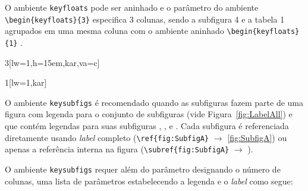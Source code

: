 	O ambiente \verb|keyfloats| pode ser aninhado e o parâmetro  do ambiente \verb|\begin{keyfloats}{3}| especifica 3 colunas, sendo a subfigura 4 e a tabela 1 agrupados em uma mesma coluna com o ambiente aninhado  \verb|\begin{keyfloats}{1}| .
			
			\begin{keyfloats}{3}[lw=1,h=15em,kar,va=c]
				\begin{keyfloats}{1}[lw=1,kar]
				\end{keyfloats}
			\end{keyfloats}
			
			
			O ambiente \verb|keysubfigs| é recomendado quando  as subfiguras fazem parte de uma figura com legenda para o conjunto de subfiguras (vide Figura~\ref{fig:LabelAll}) e que contém legendas para suas subfiguras ,  ,   e  . Cada subfigura é referenciada diretamente usando \emph{label} completo (\verb|\ref{fig:SubfigA}| $\rightarrow$ \ref{fig:SubfigA}) ou apenas a referência interna na figura (\verb|| $\rightarrow$  \subref{fig:SubfigA}). 
			
			O ambiente \verb|keysubfigs| requer além do parâmetro designando o número de colunas, uma lista de parâmetros estabelecendo a legenda e o \emph{label} como segue:

